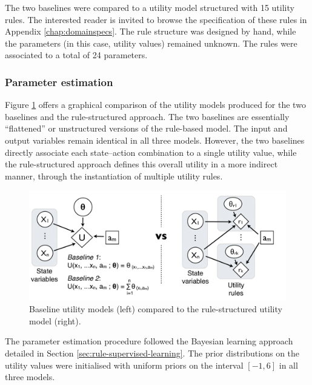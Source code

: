 The two baselines were compared to a utility model structured with 15 utility rules. The interested reader is invited to browse the specification of these rules in Appendix \ref{chap:domainspecs}. The rule structure was designed by hand, while the parameters (in this case, utility values) remained unknown. The rules were associated to a total of 24 parameters. 

\subsubsection*{Parameter estimation}

Figure \ref{fig:exp1_baselines} offers a graphical comparison of the utility models produced for the two baselines and the rule-structured approach.  The two baselines are essentially ``flattened'' or unstructured versions of the rule-based model.  The input and output variables remain identical in all three models. However, the two baselines directly associate each state--action combination to a single utility value, while the rule-structured approach defines this overall utility in a more indirect manner, through the instantiation of multiple utility rules. 

\begin{figure}[h]
\centering
\includegraphics[scale=0.40]{imgs/exp1_baselines.pdf}
\caption{Baseline utility models (left) compared to the rule-structured utility model (right).}
\label{fig:exp1_baselines}
\end{figure}


The parameter estimation procedure followed the Bayesian learning approach detailed in Section \ref{sec:rule-supervised-learning}.  The prior distributions on the utility values were initialised with uniform priors on the interval $[-1,6]$ in all three models. 


